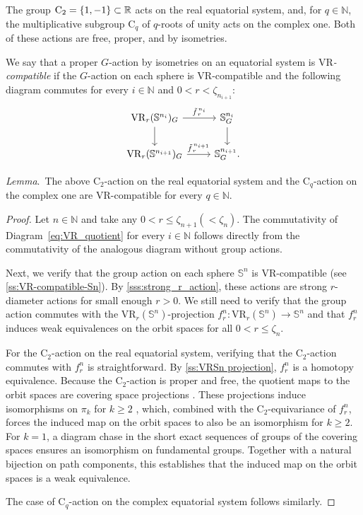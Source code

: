 \documentclass{amsart}
\theoremstyle{definition}
\newcommand{\N}{\mathbb{N}}
\newcommand{\R}{\mathbb{R}}
\newcommand{\cyc}{\mathrm{C}}
\DeclarePairedDelimiter\set{\{}{\}}
\newcommand{\bS}{\mathbb{S}}
\newcommand{\darkblue}{\color{darkblue}}
\newcommand{\defn}[1]{{\darkblue \emph{#1}}}
\newcommand{\VR}{\mathrm{VR}}
\renewcommand{\lemma}{\medskip\noindent\textit{\darkblue Lemma}.\ }
\theoremstyle{theorem}
\providecommand{\DIFaddtex}[1]{{\protect\color{blue}\uwave{#1}}} %
\providecommand{\DIFdeltex}[1]{{\protect\color{red}\sout{#1}}}                      %
\providecommand{\DIFadd}[1]{\texorpdfstring{\DIFaddtex{#1}}{#1}} %
\providecommand{\DIFdel}[1]{\texorpdfstring{\DIFdeltex{#1}}{}} %
\renewcommand{\DIFadd}[1]{{\color{red}#1}}
\renewcommand{\DIFdel}[1]{{\color{deletedpurple}\ifmmode\oldmath{#1}\else\sout{#1}\fi}}
\newcommand{\oldmath}[1]{{\color{deletedpurple}\mathpalette\horizontalstrike{#1}}}
\newcommand{\horizontalstrike}[2]{\sbox0{$#1#2$}\rlap{\raisebox{.5\ht0}{\rule{\wd0}{.4pt}}}\usebox0}
\begin{document}
The group \(\cyc_2 = \set{1,-1} \subset \R\) acts on the real equatorial system, and, for \(q \in \N\), the multiplicative subgroup \(\cyc_q\) of \(q\)-roots of unity acts on the complex one.
Both of these actions are free, proper, and by isometries.

We say that a proper \(G\)-action by isometries on an equatorial system is \defn{\(\VR\)-compatible} if the \(G\)-action on each sphere is \(\VR\)-compatible and the following diagram commutes for every \(i \in \N\) and $0 < r < \zeta_{n_{i+1}}$:
\begin{equation}\label{eq:VR_quotient}
	\begin{tikzcd}
		\VR_r(\bS^{n_i})_G
		\ar[d]
		\ar[r, "\tilde f_{\,r}^{\,n_i}" above]
		&
		\bS^{n_i}_G
		\ar[d]
		\\
		\VR_r(\bS^{n_{i+1}})_G
		\ar[r, "\tilde f_{\,r}^{\,n_{i+1}}" above]
		&
		\bS^{n_{i+1}}_G.
	\end{tikzcd}
\end{equation}

\lemma The above \(\cyc_2\)-action on the real equatorial system and the \(\cyc_q\)-action on the complex one are \(\VR\)-compatible for every \(q \in \N\).

\begin{proof}
	Let $n \in \N$ and take any $0 < r \leq \zeta_{n+1} (< \zeta_{n})$.
	The commutativity of Diagram~\ref{eq:VR_quotient} for every $i \in \N$ follows directly from the commutativity of the analogous diagram without group actions.

	Next, we verify that the group action on each sphere $\bS^n$ is \(\VR\)-compatible (see \cref{ss:VR-compatible-Sn}).
	By \cref{sss:strong_r_action}, these actions are strong \(r\)-diameter actions for small enough $r>0$.
	We still need to verify that the group action commutes with the $\VR_r(\bS^{n})$-projection $f_r^{n}\colon \VR_r(\bS^{n}) \to \bS^{n}$ and that $f_r^{n}$ induces weak equivalences on the orbit spaces for all $0 < r \leq \zeta_{n}$.

	For the $\cyc_2$-action on the real equatorial system, verifying that the $\cyc_2$-action commutes with $f_r^{n}$ is straightforward.
	By \cref{ss:VRSn projection}, $f_r^{n}$ is a homotopy equivalence.
	Because the \(\cyc_2\)-action is proper and free, the quotient maps to the orbit spaces are covering space projections \cite[\DIFdel{Prop.}\DIFadd{Proposition}~1.40]{hatcher2000}.
	These projections induce isomorphisms on \(\pi_k\) for \(k \ge 2\) \cite[\DIFdel{Prop.}\DIFadd{Proposition}~4.1]{hatcher2000}, which, combined with the \(\cyc_2\)-equivariance of $f_r^n$, forces the induced map on the orbit spaces to also be an isomorphism for \(k \ge 2\).
	For \(k=1\), a diagram chase in the short exact sequences of groups of the covering spaces ensures an isomorphism on fundamental groups.
	Together with a natural bijection on path components, this establishes that the induced map on the orbit spaces is a weak equivalence.

	The case of $\cyc_q$-action on the complex equatorial system follows similarly.
\end{proof}
\end{document}
